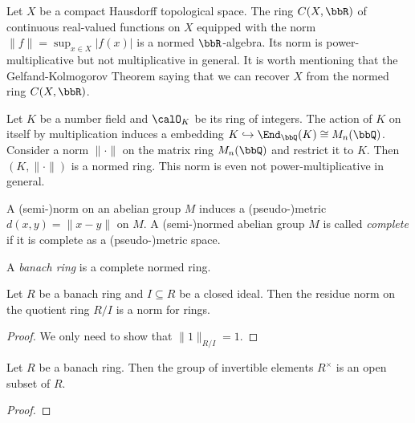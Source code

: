     \begin{example}\label{eg:ring_of_continuous_function_as_normed_rings}
        Let \(X\) be a compact Hausdorff topological space.
        The ring \(C(X, \bbR)\) of continuous real-valued functions on \(X\) equipped with the norm \(\|f\| = \sup_{x \in X} |f(x)|\) is a normed \(\bbR\)-algebra.
        Its norm is power-multiplicative but not multiplicative in general.
        It is worth mentioning that the Gelfand-Kolmogorov Theorem saying that we can recover \(X\) from the normed ring \(C(X, \bbR)\).
    \end{example}

    \begin{example}\label{eg:number_fields_as_normed_rings_by_embedding_into_matrix_rings}
        Let \(K\) be a number field and \(\calO_K\) be its ring of integers.
        The action of \(K\) on itself by multiplication induces a embedding \(K \hookrightarrow \End_{\bbQ}(K) \cong M_n(\bbQ)\).
        Consider a norm \(\|\cdot\|\) on the matrix ring \(M_n(\bbQ)\) and restrict it to \(K\).
        Then \((K, \|\cdot\|)\) is a normed ring.
        This norm is even not power-multiplicative in general.
    \end{example}

    \begin{definition}\label{def:complete_semi-normed_abelian_group}
        A (semi-)norm on an abelian group \(M\) induces a (pseudo-)metric \(d(x,y) = \|x - y\|\) on \(M\).
        A (semi-)normed abelian group \(M\) is called \emph{complete} if it is complete as a (pseudo-)metric space.
    \end{definition}

    \begin{definition}\label{def:banach_ring}
        A \emph{banach ring} is a complete normed ring.
    \end{definition}

    \begin{proposition}\label{prop:residue_norm_is_a_norm_for_banach_rings}
        Let \(R\) be a banach ring and \(I \subseteq R\) be a closed ideal.
        Then the residue norm on the quotient ring \(R/I\) is a norm for rings.
    \end{proposition}
    \begin{proof}
        We only need to show that \(\|1\|_{R/I} = 1\).
    \end{proof}

    \begin{proposition}\label{prop:invertible_elements_form_an_open_subset_of_banach_rings}
        Let \(R\) be a banach ring.
        Then the group of invertible elements \(R^\times\) is an open subset of \(R\).
    \end{proposition}
    \begin{proof}
    \end{proof}

